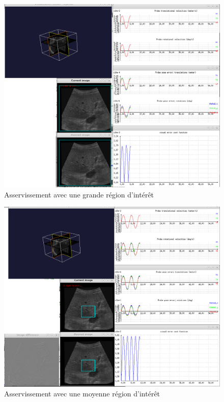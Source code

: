 \documentclass[a4paper,11pt]{article}
\begin{document}
\begin{figure}[H]
    \centering
    \includegraphics[width=0.5\textheight]{./images/q9_large.png}
    \caption{Asservissement avec une grande r\'egion d'int\'er\^et}
    \label{largeRoi}
\end{figure}
\begin{figure}[H]
    \centering
    \includegraphics[width=0.5\textheight]{./images/q9_medium.png}
    \caption{Asservissement avec une moyenne r\'egion d'int\'er\^et}
    \label{mediumRoi}
\end{figure}
\end{document}
